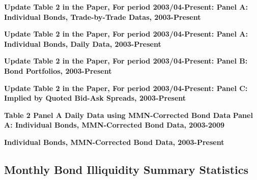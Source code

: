 \documentclass{article}
\newcommand*{\PathToOutput}{../output/}%
\begin{document}
\begin{table}[hbt!]
\centering
\textbf{\large Update Table 2 in the Paper, For period 2003/04-Present: Panel A: Individual Bonds, Trade-by-Trade Datas, 2003-Present}
\resizebox{\textwidth}{!}{%
    
}
\label{table:table2_panelA_trade_by_trade_new}
\end{table}

\begin{table}[hbt!]
\centering
\textbf{\large Update Table 2 in the Paper, For period 2003/04-Present: Panel A: Individual Bonds, Daily Data, 2003-Present}
\resizebox{\textwidth}{!}{%
    
}
\label{table:table2_panelA_daily_new}
\end{table}


\begin{table}[hbt!]
\centering
\textbf{\large Update Table 2 in the Paper, For period 2003/04-Present: Panel B: Bond Portfolios, 2003-Present}
\resizebox{\textwidth}{!}{%
    
}
\label{table:table2_panelB_new}
\end{table}


\begin{table}[hbt!]
\centering
\textbf{\large Update Table 2 in the Paper, For period 2003/04-Present: Panel C: Implied by Quoted Bid-Ask Spreads, 2003-Present}
\resizebox{\textwidth}{!}{%
    
}
\label{table:table2_panelC_new}
\end{table}



\begin{table}[hbt!]
\centering
\textbf{\large Table 2 Panel A Daily Data using MMN-Corrected Bond Data}
\textbf{\large Panel A: Individual Bonds, MMN-Corrected Bond Data, 2003-2009}

\label{table:table2_daily_mmn_paper}
\end{table}


\begin{table}[hbt!]
\centering
\textbf{\large Individual Bonds, MMN-Corrected Bond Data, 2003-Present}
\resizebox{\textwidth}{!}{%
    
}
\label{table:table2_daily_mmn_new}
\end{table}


\subsection{Monthly Bond Illiquidity Summary Statistics}
\end{document}
